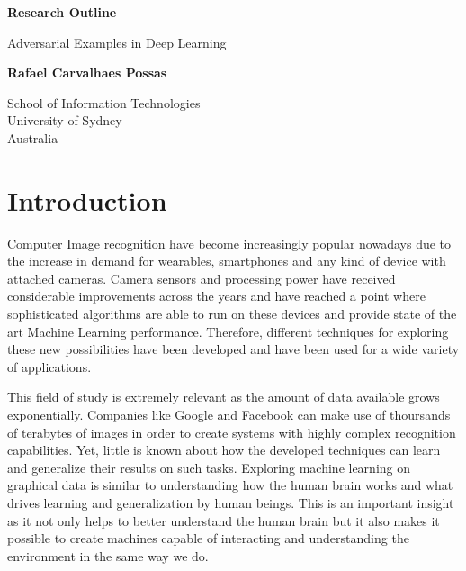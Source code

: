 \documentclass{article}
\begin{document}
\begin{titlepage}
    \begin{center}
        \vspace*{1cm}
        \huge
        \textbf{Research Outline}
        
        \vspace{0.5cm}
        \LARGE
        Adversarial Examples in Deep Learning

        
        \vspace{1.5cm}
        
        \textbf{Rafael Carvalhaes Possas}
        
        \vfill
        
        \vspace{0.8cm}
        
        
        School of Information Technologies\\
        University of Sydney\\
        Australia\\

        
    \end{center}
\end{titlepage}
\section{Introduction}\label{sec:intro}

Computer Image recognition have become increasingly popular nowadays due to the increase in demand for wearables, smartphones and any kind of device with attached cameras. Camera sensors and processing power have received considerable improvements across the years and have reached a point where sophisticated algorithms are able to run on these devices and provide state of the art Machine Learning performance. Therefore, different techniques for exploring these new possibilities have been developed and have been used for a wide variety of applications.

This field of study is extremely relevant as the amount of data available grows exponentially. Companies like Google and Facebook can make use of thoursands of terabytes of images in order to create systems with highly complex recognition capabilities. Yet, little is known about how the developed techniques can learn and generalize their results on such tasks. Exploring machine learning on graphical data is similar to understanding how the human brain works and what drives learning and generalization by human beings. This is an important insight as it not only helps to better understand the human brain but it also makes it possible to create machines capable of interacting and understanding the environment in the same way we do.
\end{document}
